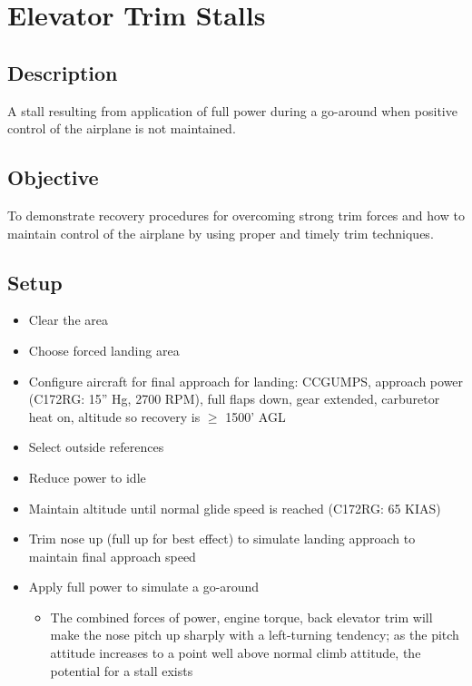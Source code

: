 \section{Elevator Trim Stalls}

\subsection{Description}

A stall resulting from application of full power during a go-around when
positive control of the airplane is not maintained.

\subsection{Objective}

To demonstrate recovery procedures for overcoming strong trim forces and how to
maintain control of the airplane by using proper and timely trim techniques.

\subsection{Setup}

\begin{itemize}
  \item Clear the area
  \item Choose forced landing area
  \item Configure aircraft for final approach for landing: CCGUMPS, approach
    power (C172RG: 15'' Hg, 2700 RPM), full flaps down, gear extended,
    carburetor heat on, altitude so recovery is $\geq$ 1500' AGL
  \item Select outside references
  \item Reduce power to idle
  \item Maintain altitude until normal glide speed is reached (C172RG: 65 KIAS)
  \item Trim nose up (full up for best effect) to simulate landing approach to
    maintain final approach speed
  \item Apply full power to simulate a go-around
    \begin{itemize}
      \item The combined forces of power, engine torque, back elevator trim
        will make the nose pitch up sharply with a left-turning tendency; as
        the pitch attitude increases to a point well above normal climb
        attitude, the potential for a stall exists
    \end{itemize}
\end{itemize}

